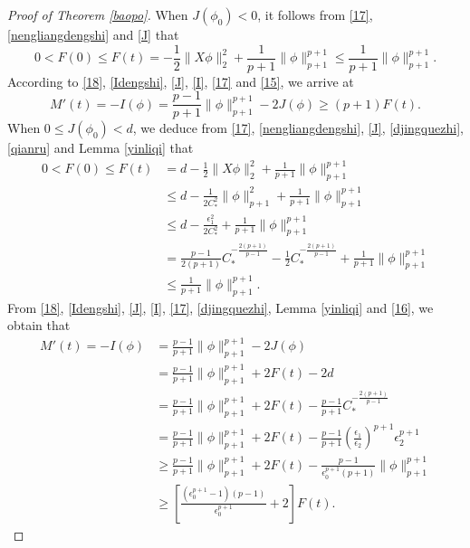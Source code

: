 \documentclass[11pt,a4paper]{article}
\numberwithin{equation}{section}
\numberwithin{remark}{section}
\begin{document}
\begin{proof}[Proof of Theorem \ref{baopo}]
When $J(\phi_0)<0$, it follows from \eqref{17}, \eqref{nengliangdengshi} and \eqref{J} that
\begin{equation}\label{15}
0<F(0)\leq F(t)=-\frac{1}{2}\|X\phi\|_2^2+\frac{1}{p+1}\|\phi\|_{p+1}^{p+1}\leq\frac{1}{p+1}\|\phi\|_{p+1}^{p+1}.
\end{equation}
According to \eqref{18}, \eqref{Idengshi}, \eqref{J}, \eqref{I}, \eqref{17} and \eqref{15}, we arrive at
\begin{equation}\label{19}
M'(t)=-I(\phi)=\frac{p-1}{p+1}\|\phi\|_{p+1}^{p+1}-2J(\phi)\geq(p+1)F(t).
\end{equation}
When $0\leq J(\phi_0)<d$, we deduce from \eqref{17}, \eqref{nengliangdengshi}, \eqref{J}, \eqref{djingquezhi}, \eqref{qianru} and Lemma \ref{yinliqi} that
\begin{equation}\label{16}
\begin{split}
0<F(0)\leq F(t)&=d-\frac{1}{2}\|X\phi\|_2^2+\frac{1}{p+1}\|\phi\|_{p+1}^{p+1}\\
&\leq d-\frac{1}{2C_*^2}\|\phi\|_{p+1}^2+\frac{1}{p+1}\|\phi\|_{p+1}^{p+1}\\
&\leq d-\frac{\epsilon_1^2}{2C_*^2}+\frac{1}{p+1}\|\phi\|_{p+1}^{p+1}\\
&=\frac{p-1}{2(p+1)}C_*^{-\frac{2(p+1)}{p-1}}-\frac{1}{2}C_*^{-\frac{2(p+1)}{p-1}}+\frac{1}{p+1}\|\phi\|_{p+1}^{p+1}\\
&\leq\frac{1}{p+1}\|\phi\|_{p+1}^{p+1}.
\end{split}\end{equation}
From \eqref{18}, \eqref{Idengshi}, \eqref{J}, \eqref{I}, \eqref{17}, \eqref{djingquezhi}, Lemma \ref{yinliqi} and \eqref{16}, we obtain that
\begin{equation}\label{12}
\begin{split}
M'(t)=-I(\phi)&=\frac{p-1}{p+1}\|\phi\|_{p+1}^{p+1}-2J(\phi)\\
&=\frac{p-1}{p+1}\|\phi\|_{p+1}^{p+1}+2F(t)-2d\\
&=\frac{p-1}{p+1}\|\phi\|_{p+1}^{p+1}+2F(t)-\frac{p-1}{p+1}C_*^{-\frac{2(p+1)}{p-1}}\\
&=\frac{p-1}{p+1}\|\phi\|_{p+1}^{p+1}+2F(t)-\frac{p-1}{p+1}\left(\frac{\epsilon_1}{\epsilon_2}\right)^{p+1}\epsilon_2^{p+1}\\
&\geq\frac{p-1}{p+1}\|\phi\|_{p+1}^{p+1}+2F(t)-\frac{p-1}{\epsilon_0^{p+1}(p+1)}\|\phi\|_{p+1}^{p+1}\\
&\geq \left[\frac{\left(\epsilon_0^{p+1}-1\right)(p-1)}{\epsilon_0^{p+1}}+2\right]F(t).
\end{split}\end{equation}

\end{proof}
\end{document}
